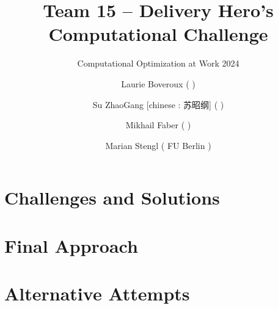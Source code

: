 \documentclass[a4paper]{article}
\title{Team 15 -- Delivery Hero's Computational Challenge}
\subtitle{Computational Optimization at Work 2024}
\author{Laurie Boveroux ( ) \and%
        Su ZhaoGang [chinese : 苏昭纲] ( ) \and%
        Mikhail Faber ( ) \and%
        Marian Stengl ( FU Berlin )}
\newcommand\path{.}
\begin{document}
%
\maketitle%
\section*{Challenges and Solutions}%
%
\section*{Final Approach}%
%
\section*{Alternative Attempts}%
%
\end{document}
